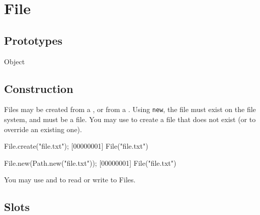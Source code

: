 
\section{File}

\subsection{Prototypes}
\begin{refObjects}
\item[Object]
\end{refObjects}

\subsection{Construction}

Files may be created from a , or from a .
Using \lstinline|new|, the file must exist on the file system, and must be a
file.  You may use  to create a file that does not exist (or
to override an existing one).

\begin{urbiscript}[firstnumber=1]
File.create("file.txt");
[00000001] File("file.txt")

File.new(Path.new("file.txt"));
[00000001] File("file.txt")
\end{urbiscript}

You may use  and  to
read or write to Files.

\subsection{Slots}

